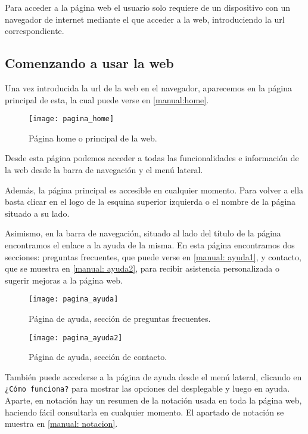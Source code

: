 Para acceder a la página web el usuario solo requiere de un dispositivo con un navegador de internet mediante el que acceder a la web, introduciendo la url correspondiente.

\subsection{Comenzando a usar la web}

Una vez introducida la url de la web en el navegador, aparecemos en la página principal de esta, la cual puede verse en \eqref{manual:home}.

\begin{figure}
\begin{center}
\caption{Página home o principal de la web.}
\label{manual: home}
\texttt{[image: pagina\_home]}
\end{center}
\end{figure}

Desde esta página podemos acceder a todas las funcionalidades e información de la web desde la barra de navegación y el menú lateral.

Además, la página principal es accesible en cualquier momento. Para volver a ella basta clicar en el logo de la esquina superior izquierda o el nombre de la página situado a su lado.

Asimismo, en la barra de navegación, situado al lado del título de la página encontramos el enlace a la ayuda de la misma. En esta página encontramos dos secciones: preguntas frecuentes, que puede verse en \eqref{manual: ayuda1}, y contacto, que se muestra en \eqref{manual: ayuda2}, para recibir asistencia personalizada o sugerir mejoras a la página web.

\begin{figure}
\begin{center}
\caption{Página de ayuda, sección de preguntas frecuentes.}
\label{manual: ayuda1}
\texttt{[image: pagina\_ayuda]}
\end{center}
\end{figure}

\begin{figure}
\begin{center}
\caption{Página de ayuda, sección de contacto.}
\label{manual: ayuda2}
\texttt{[image: pagina\_ayuda2]}
\end{center}
\end{figure}

También puede accederse a la página de ayuda desde el menú lateral, clicando en \verb|¿Cómo funciona?| para mostrar las opciones del desplegable y luego en ayuda. Aparte, en notación hay un resumen de la notación usada en toda la página web, haciendo fácil consultarla en cualquier momento. El apartado de notación se muestra en \eqref{manual: notacion}.

